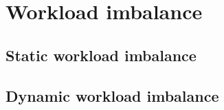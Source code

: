 \section{Workload imbalance}
\label{section:distributed-memory:workload-imbalance}

\subsection{Static workload imbalance}

\subsection{Dynamic workload imbalance}
